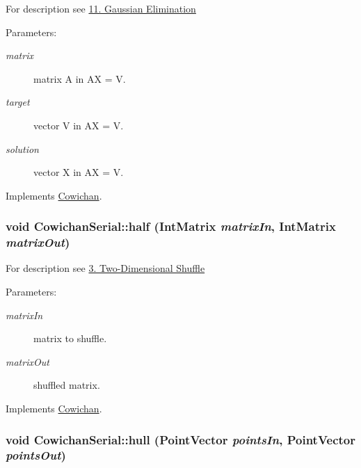 For description see \hyperlink{index_gauss_sec}{11. Gaussian Elimination} \begin{Desc}
\item[Parameters:]
\begin{description}
\item[{\em matrix}]matrix A in AX = V. \item[{\em target}]vector V in AX = V. \item[{\em solution}]vector X in AX = V. \end{description}
\end{Desc}


Implements \hyperlink{class_cowichan_aa9aac74b96dc5ed33e821d94649d1b2}{Cowichan}.\hypertarget{class_cowichan_serial_c08a6b3e23ce26959bac12af077f924f}{
\subsubsection[{half}]{\setlength{\rightskip}{0pt plus 5cm}void CowichanSerial::half ({\bf IntMatrix} {\em matrixIn}, \/  {\bf IntMatrix} {\em matrixOut})}}
\label{class_cowichan_serial_c08a6b3e23ce26959bac12af077f924f}


For description see \hyperlink{index_half_sec}{3. Two-Dimensional Shuffle} \begin{Desc}
\item[Parameters:]
\begin{description}
\item[{\em matrixIn}]matrix to shuffle. \item[{\em matrixOut}]shuffled matrix. \end{description}
\end{Desc}


Implements \hyperlink{class_cowichan_308603053675bccbe631f04af921f57c}{Cowichan}.\hypertarget{class_cowichan_serial_e75cedf0a296dd7ad3dc41cadc51776f}{
\subsubsection[{hull}]{\setlength{\rightskip}{0pt plus 5cm}void CowichanSerial::hull ({\bf PointVector} {\em pointsIn}, \/  {\bf PointVector} {\em pointsOut})}}
\label{class_cowichan_serial_e75cedf0a296dd7ad3dc41cadc51776f}


